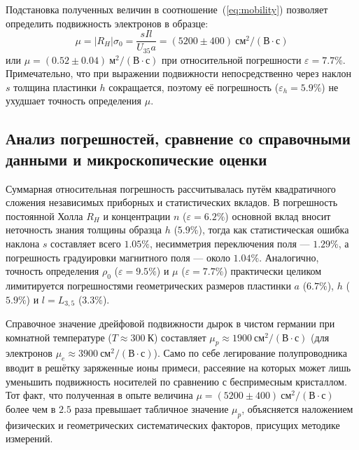 \documentclass[reprint, amsmath, amssymb, aps, pra, nofootinbib]{revtex4-2}
\begin{document}
Подстановка полученных величин в соотношение~(\ref{eq:mobility}) позволяет определить подвижность электронов в образце:
\begin{equation}
\mu = |R_H|\sigma_0 = \frac{s I l}{U_{35} a} = (5200 \pm 400)~\text{см}^2/(\text{В}\cdot\text{с})
\label{eq:mu_res}
\end{equation}
или $\mu = (0.52 \pm 0.04)~\text{м}^2/(\text{В}\cdot\text{с})$ при относительной погрешности $\varepsilon = 7.7\%$. 
Примечательно, что при выражении подвижности непосредственно через наклон $s$ толщина пластинки $h$ сокращается, поэтому её погрешность ($\varepsilon_h = 5.9\%$) не ухудшает точность определения $\mu$. 

\subsection{Анализ погрешностей, сравнение со справочными данными и микроскопические оценки}
Суммарная относительная погрешность рассчитывалась путём квадратичного сложения независимых приборных и статистических вкладов. 
В погрешность постоянной Холла $R_H$ и концентрации $n$ ($\varepsilon = 6.2\%$) основной вклад вносит неточность знания толщины образца $h$ ($5.9\%$), тогда как статистическая ошибка наклона $s$ составляет всего $1.05\%$, несимметрия переключения поля — $1.29\%$, а погрешность градуировки магнитного поля — около $1.04\%$. 
Аналогично, точность определения $\rho_0$ ($\varepsilon = 9.5\%$) и $\mu$ ($\varepsilon = 7.7\%$) практически целиком лимитируется погрешностями геометрических размеров пластинки $a$ ($6.7\%$), $h$ ($5.9\%$) и $l = L_{3,5}$ ($3.3\%$).

Справочное значение дрейфовой подвижности дырок в чистом германии при комнатной температуре ($T \approx 300~\text{К}$) составляет $\mu_p \approx 1900~\text{см}^2/(\text{В}\cdot\text{с})$ (для электронов $\mu_e \approx 3900~\text{см}^2/(\text{В}\cdot\text{с})$). 
Само по себе легирование полупроводника вводит в решётку заряженные ионы примеси, рассеяние на которых может лишь уменьшить подвижность носителей по сравнению с беспримесным кристаллом.
Тот факт, что полученная в опыте величина $\mu = (5200 \pm 400)~\text{см}^2/(\text{В}\cdot\text{с})$ более чем в $2.5$ раза превышает табличное значение $\mu_p$, объясняется наложением физических и геометрических систематических факторов, присущих методике измерений. 
\end{document}
